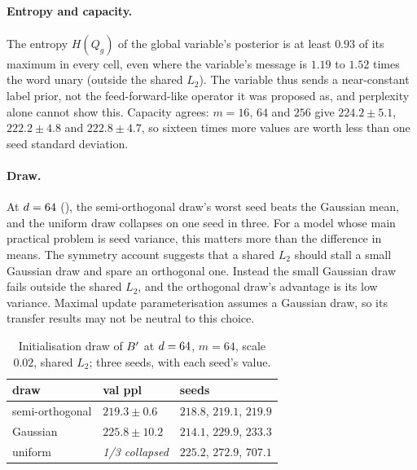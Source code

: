 \paragraph{Entropy and capacity.}
The entropy $H(Q_g)$ of the global variable's posterior is at least $0.93$ of its maximum in every
cell, even where the variable's message is $1.19$ to $1.52$ times the word unary (outside the shared $L_2$). The
variable thus sends a near-constant label prior, not the feed-forward-like operator it was
proposed as, and perplexity alone cannot show this. Capacity agrees: $m=16$, $64$ and $256$ give
$224.2\pm5.1$, $222.2\pm4.8$ and $222.8\pm4.7$, so sixteen times more values are worth less than
one seed standard deviation.

\paragraph{Draw.}
At $d=64$ (), the semi-orthogonal draw's worst seed beats the Gaussian mean,
and the uniform draw collapses on one seed in three. For a model whose main practical problem is
seed variance, this matters more than the difference in means. The symmetry account suggests
that a shared $L_2$ should stall a small Gaussian draw and spare an orthogonal one. Instead the
small Gaussian draw fails outside the shared $L_2$, and the orthogonal draw's advantage is its low
variance. Maximal update parameterisation \citep{yang2022tensor} assumes a Gaussian draw, so its
transfer results may not be neutral to this choice.

\begin{table}[t]
\centering\footnotesize

\caption{Initialisation draw at the original temperature, undamped, one seed per cell,
$6{,}000$ steps. The seed
sd of this configuration is \ReproUndampedSd{} () and the largest difference
here is $326$, so no conclusion is drawn;  repeats the question at three
seeds.}
\label{tab:init}
\end{table}

\begin{table}[t]
\centering\footnotesize
\begin{tabular}{@{}l@{\ \ }l@{\ \ }l@{}}
\toprule
draw & val ppl & seeds \\
\midrule
semi-orthogonal & $219.3 \pm 0.6$ & $218.8$, $219.1$, $219.9$ \\
Gaussian & $225.8 \pm 10.2$ & $214.1$, $229.9$, $233.3$ \\
uniform & \textit{1/3 collapsed} & $225.2$, $272.9$, $707.1$ \\
\bottomrule
\end{tabular}
\caption{Initialisation draw of $B'$ at $d=64$, $m=64$, scale $0.02$, shared $L_2$;
three seeds, with each seed's value.}
\label{tab:draws}
\end{table}

